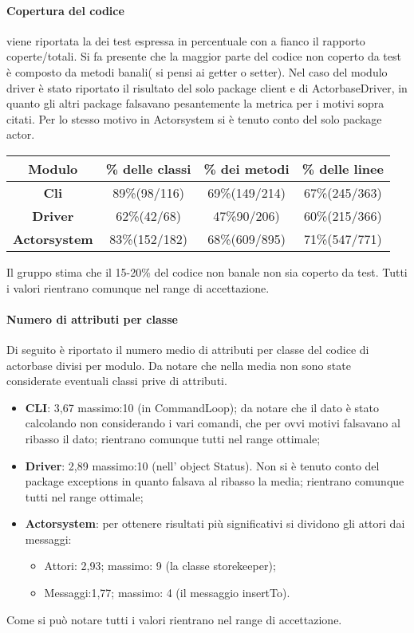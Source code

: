 \documentclass{scalatekids-article}
\begin{document}
\paragraph{Copertura del codice}
viene riportata la dei test espressa in percentuale con a fianco il rapporto coperte/totali. Si fa presente che la maggior parte del codice non coperto da test è composto da metodi banali( si pensi ai getter o setter). Nel caso del  modulo driver è stato riportato il risultato del solo package client e di ActorbaseDriver, in quanto gli altri package falsavano pesantemente la metrica per i motivi sopra citati. Per lo stesso motivo in Actorsystem si è tenuto conto del solo package actor.
\begin{center}
	\begin{tabular}{| c | c | c | c |}
		\hline
		Modulo & \% delle classi & \% dei metodi & \% delle linee \\
		\hline
		\textbf{Cli} & 89\%(98/116) & 69\%(149/214) & 67\%(245/363) \\
		\textbf{Driver} &  62\%(42/68) & 47\%90/206) & 60\%(215/366)\\
		\textbf{Actorsystem} & 83\%(152/182) & 68\%(609/895) & 71\%(547/771)\\
		\hline
	\end{tabular}
	\end{center}
	Il gruppo stima che il 15-20\% del codice non banale non sia coperto da test. Tutti i valori rientrano comunque nel range di accettazione.
	\paragraph{Numero di attributi per classe}
	Di seguito è riportato il numero medio di attributi per classe del codice di actorbase divisi per modulo. Da notare che nella media non sono state considerate eventuali classi prive di attributi.
	\begin{itemize}
		\item \textbf{CLI}: 3,67 massimo:10 (in CommandLoop); da notare che il dato è stato calcolando non considerando i vari comandi, che per ovvi motivi falsavano al ribasso il dato; rientrano comunque tutti nel range ottimale;
		\item \textbf{Driver}: 2,89 massimo:10 (nell' object Status). Non si è tenuto conto del package exceptions in quanto falsava al ribasso la media; rientrano comunque tutti nel range ottimale;
		\item \textbf{Actorsystem}: per ottenere risultati più significativi si dividono gli attori dai messaggi:
		\begin{itemize}
			\item Attori: 2,93; massimo: 9 (la classe storekeeper);
			\item Messaggi:1,77; massimo: 4 (il messaggio insertTo).
		\end{itemize}
	\end{itemize}
	Come si può notare tutti i valori rientrano nel range di accettazione.
	
\end{document}

